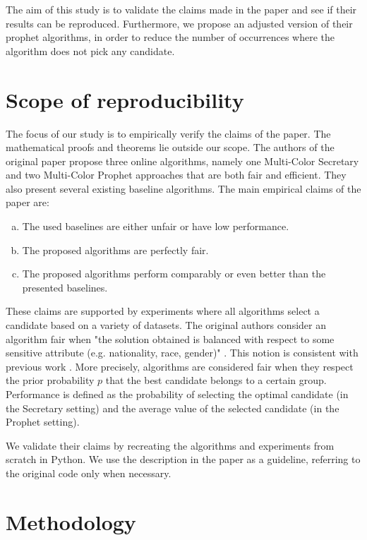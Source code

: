 The aim of this study is to validate the claims made in the paper and see if their results can be reproduced. Furthermore, we propose an adjusted version of their prophet algorithms, in order to reduce the number of occurrences where the algorithm does not pick any candidate.

\section{Scope of reproducibility}
\label{sec:claims}
The focus of our study is to empirically verify the claims of the paper. The mathematical proofs and theorems lie outside our scope. The authors of the original paper propose three online algorithms, namely one Multi-Color Secretary and two Multi-Color Prophet approaches that are both fair and efficient. They also present several existing baseline algorithms. The main empirical claims of the paper are:

\begin{enumerate}[a)]
    \item The used baselines are either unfair or have low performance.
    \item The proposed algorithms are perfectly fair.
    \item The proposed algorithms perform comparably or even better than the presented baselines.
\end{enumerate}


These claims are supported by experiments where all algorithms select a candidate based on a variety of datasets. The original authors consider an algorithm fair when "the solution obtained is balanced with respect to some sensitive attribute (e.g. nationality, race, gender)" \citet{correa21}. This notion is consistent with previous work \citet{ Celis_a, Celis_b, Celis_c, Chierichetti2017,Chierichetti2019, halabi}. More precisely, algorithms are considered fair when they respect the prior probability $p$ that the best candidate belongs to a certain group. Performance is defined as the probability of selecting the optimal candidate (in the Secretary setting) and the average value of the selected candidate (in the Prophet setting). 

We validate their claims by recreating the algorithms and experiments from scratch in Python. We use the description in the paper as a guideline, referring to the original code only when necessary.

\section{Methodology}

